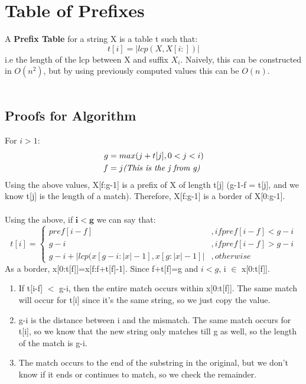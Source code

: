 \section{Table of Prefixes}
A \textbf{Prefix Table} for a string X is a table t such that:
\begin{equation}
    t[i] = | lcp( X, X[i:]) | \nonumber
\end{equation}
i.e the length of the lcp between X and suffix $X_i$. Naively, this can be constructed in $O(n^2)$, but by using previously computed values this can be $O(n)$. \\ \\

\subsection{Proofs for Algorithm}
For $i > 1$:
\begin{align}
    g &= max(j+t[j], 0< j <i) \nonumber \\ 
    f &= j \emph{(This is the j from g)} \nonumber
\end{align}
Using the above values, X[f:g-1] is a prefix of X of length t[j] (g-1-f = t[j], and we know t[j] is the length of a match). Therefore, X[f:g-1] is a border of X[0:g-1]. \\ \\
Using the above, if $\boldsymbol{i < g}$ we can say that:
\begin{equation}
    t[i] = 
    \begin{cases}
        pref[i-f] &, if pref[i-f] < g-i \\
        g-i &, if pref[i-f] > g-i \\
        g-i + |lcp(x[g-i:|x|-1], x[g:|x|-1]| &, otherwise
    \end{cases} \nonumber
\end{equation}
As a border, x[0:t[f]]=x[f:f+t[f]-1]. Since f+t[f]=g and $i<g$, i $\in$ x[0:t[f]].  
\begin{enumerate}
    \item If t[i-f] $<$ g-i, then the entire match occurs within x[0:t[f]]. The same match will occur for t[i] since it's the same string, so we just copy the value. 
    \item g-i is the distance between i and the mismatch. The same match occurs for t[i], so we know that the new string only matches till g as well, so the length of the match is g-i.
    \item The match occurs to the end of the substring in the original, but we don't know if it ends or continues to match, so we check the remainder.
\end{enumerate}
\newpage
